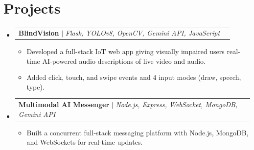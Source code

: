 \documentclass[letterpaper,11pt]{article}
\makeatletter
\newcommand{\resumeItem}[1]{
  \item\small{
    {#1 \vspace{-2pt}}
  }
}
\newcommand{\resumeProjectHeading}[2]{
    \item
    \begin{tabular*}{0.97\textwidth}{l@{\extracolsep{\fill}}r}
      \small#1 & #2 \\
    \end{tabular*}\vspace{-7pt}
}
\newcommand{\resumeSubHeadingListStart}{\begin{itemize}[leftmargin=0.15in, label={}]}
\newcommand{\resumeSubHeadingListEnd}{\end{itemize}}
\newcommand{\resumeItemListStart}{\begin{itemize}[leftmargin=0.2in]}
\newcommand{\resumeItemListEnd}{\end{itemize}\vspace{-5pt}}
\makeatother
\begin{document}
\section{Projects}
\resumeSubHeadingListStart

    \resumeProjectHeading
      {\textbf{BlindVision} $|$ \emph{Flask, YOLOv8, OpenCV, Gemini API, JavaScript}}{}
      \resumeItemListStart
        \resumeItem{Developed a full-stack IoT web app giving visually impaired users real-time AI-powered audio descriptions of live video and audio.}
        \resumeItem{Added click, touch, and swipe events and 4 input modes (draw, speech, type).}
      \resumeItemListEnd

    \resumeProjectHeading
      {\textbf{Multimodal AI Messenger} $|$ \emph{Node.js, Express, WebSocket, MongoDB, Gemini API}}{}
      \resumeItemListStart
        \resumeItem{Built a concurrent full-stack messaging platform with Node.js, MongoDB, and WebSockets for real-time updates.}
      \resumeItemListEnd

\resumeSubHeadingListEnd
\end{document}
